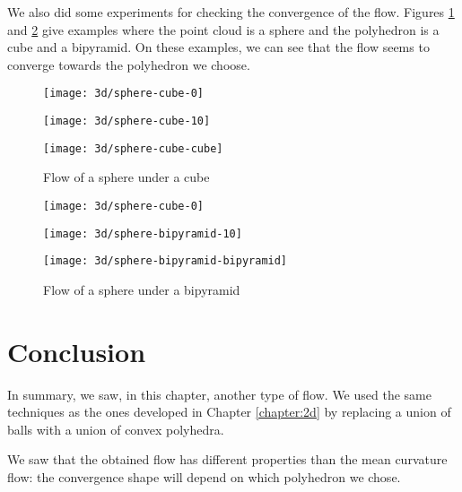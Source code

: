 We also did some experiments for checking the convergence of the flow. Figures
\ref{fig:3d-flow-sphere-cube} and \ref{fig:3d-flow-sphere-bipyramid} give
examples where the point cloud is a sphere and the polyhedron is a cube and a
bipyramid. On these examples, we can see that the flow seems to converge towards
the polyhedron we choose.

\begin{figure}[h]
    \centering
    \begin{minipage}{0.32\linewidth}
        \centering
        \texttt{[image: 3d/sphere-cube-0]}
    \end{minipage}
    \begin{minipage}{0.32\linewidth}
        \centering
        \texttt{[image: 3d/sphere-cube-10]}
    \end{minipage}
    \begin{minipage}{0.32\linewidth}
        \centering
        \texttt{[image: 3d/sphere-cube-cube]}
    \end{minipage}

    \caption{Flow of a sphere under a cube}
    \label{fig:3d-flow-sphere-cube}
\end{figure}

\begin{figure}[h]
    \centering
    \begin{minipage}{0.32\linewidth}
        \centering
        \texttt{[image: 3d/sphere-cube-0]}
    \end{minipage}
    \begin{minipage}{0.32\linewidth}
        \centering
        \texttt{[image: 3d/sphere-bipyramid-10]}
    \end{minipage}
    \begin{minipage}{0.32\linewidth}
        \centering
        \texttt{[image: 3d/sphere-bipyramid-bipyramid]}
    \end{minipage}

    \caption{Flow of a sphere under a bipyramid}
    \label{fig:3d-flow-sphere-bipyramid}
\end{figure}

\section{Conclusion}

In summary, we saw, in this chapter, another type of flow. We used the same
techniques as the ones developed in Chapter \ref{chapter:2d} by replacing a
union of balls with a union of convex polyhedra.

We saw that the obtained flow has different properties than the mean curvature
flow: the convergence shape will depend on which polyhedron we chose.



